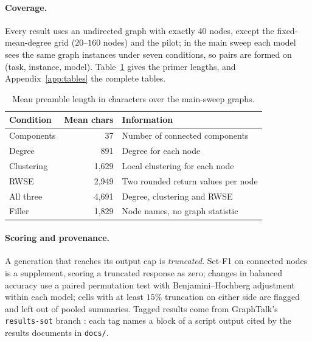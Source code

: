 \documentclass[11pt]{article}
\begin{document}


\paragraph{Coverage.} Every result uses an undirected graph with exactly 40 nodes, except the fixed-mean-degree grid ($20$--$160$ nodes) and the pilot; in the main sweep each model sees the same graph instances under seven conditions, so pairs are formed on (task, instance, model). %
Table~\ref{tab:primerlength} gives the primer lengths, and Appendix~\ref{app:tables} the complete tables.

\begin{table}[h]
\centering\footnotesize
\setlength{\tabcolsep}{4pt}
\begin{tabular}{lrp{3.1cm}}
\toprule
Condition & Mean chars & Information\\
\midrule
Components & 37 & Number of connected components\\ %
Degree & 891 & Degree for each node\\ %
Clustering & 1,629 & Local clustering for each node\\ %
RWSE & 2,949 & Two rounded return values per node\\ %
All three & 4,691 & Degree, clustering and RWSE\\ %
Filler & 1,829 & Node names, no graph statistic\\ %
\bottomrule
\end{tabular}
\caption{Mean preamble length in characters over the main-sweep graphs.} %
\label{tab:primerlength}
\end{table}

\paragraph{Scoring and provenance.} A generation that reaches its output cap is \emph{truncated}. Set-F1 on connected nodes is a supplement, scoring a truncated response as zero; changes in balanced accuracy use a paired permutation test with Benjamini--Hochberg adjustment within each model; cells with at least $15\%$ truncation on either side are flagged and left out of pooled summaries. %
Tagged results come from GraphTalk's \texttt{results-sot} branch \citep{graphtalkresults2026}: each tag names a block of a script output cited by the results documents in \texttt{docs/}.
\end{document}
